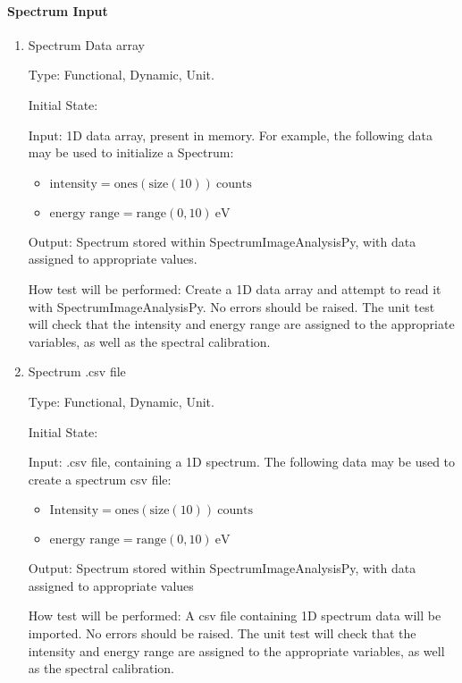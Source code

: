 \documentclass[12pt, titlepage]{article}
\newcommand{\progname}{SpectrumImageAnalysisPy}
\begin{document}
\paragraph{Spectrum Input}

\begin{enumerate}

\item{Spectrum Data array}

Type: Functional, Dynamic, Unit.
					
Initial State: 
					
Input: 1D data array, present in memory. For example, the following data may be
used to initialize a Spectrum:
\begin{itemize}
	\item $\text{intensity} = \text{ones}(\text{size}(10))\ \text{counts}$
	\item $\text{energy range} = \text{range}(0, 10)\ \si{\electronvolt}$
\end{itemize}

Output: Spectrum stored within \progname{}, with data assigned to appropriate
values.
					
How test will be performed: Create a 1D data array and attempt to read it with
\progname{}. No errors should be raised. The unit test will check that the
intensity and energy range are assigned to the appropriate variables, as well as
the spectral calibration.


\item{Spectrum .csv file}

Type: Functional, Dynamic, Unit.

Initial State: 

Input: .csv file, containing a 1D spectrum. The following data may be used to
create a spectrum csv file:
\begin{itemize}
	\item $\text{Intensity} = \text{ones}(\text{size}(10))\ \text{counts}$
	\item $\text{energy range} = \text{range}(0, 10)\ \si{\electronvolt}$
\end{itemize}

Output: Spectrum stored within \progname{}, with data assigned to appropriate
values

How test will be performed: A csv file containing 1D spectrum data will be
imported. No errors should be raised. The unit test will check that the
intensity and energy range are assigned to the appropriate variables, as well as
the spectral calibration.



\end{enumerate}
\end{document}
